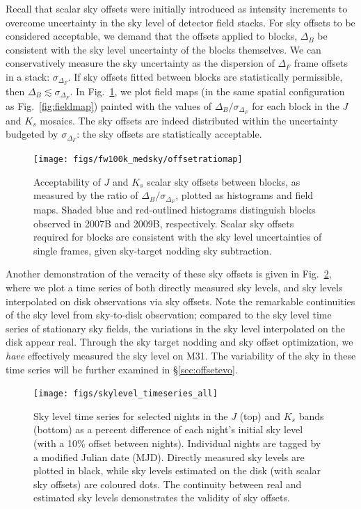 \documentclass[iop]{emulateapj}
\newcommand{\Fig}[1]{Fig.~\ref{fig:#1}}  %
\newcommand{\Sec}[1]{\S\ref{sec:#1}}  %
\begin{document}
Recall that scalar sky offsets were initially introduced as intensity increments to overcome uncertainty in the sky level of detector field stacks.
For sky offsets to be considered acceptable, we demand that the offsets applied to blocks, $\Delta_B$ be consistent with the sky level uncertainty of the blocks themselves.
We can conservatively measure the sky uncertainty as the dispersion of $\Delta_F$ frame offsets in a stack: $\sigma_{\Delta_F}$.
If sky offsets fitted between blocks are statistically permissible, then $\Delta_B \lesssim \sigma_{\Delta_F}$.
In \Fig{offset_ratio_map}, we plot field maps (in the same spatial configuration as \Fig{fieldmap}) painted with the values of $\Delta_B / \sigma_{\Delta_F}$ for each block in the $J$ and $K_s$ mosaics.
The sky offsets are indeed distributed within the uncertainty budgeted by $\sigma_{\Delta_F}$: the sky offsets are statistically acceptable.

\begin{figure}[t]
\centering
\texttt{[image: figs/fw100k\_medsky/offsetratiomap]}
\caption{Acceptability of $J$ and $K_s$ scalar sky offsets between blocks, as measured by the ratio of $\Delta_B/\sigma_{\Delta_F}$, plotted as histograms and field maps. Shaded blue and red-outlined histograms distinguish blocks observed in 2007B and 2009B, respectively. Scalar sky offsets required for blocks are consistent with the sky level uncertainties of single frames, given sky-target nodding sky subtraction.}
\label{fig:offset_ratio_map}
\end{figure}

Another demonstration of the veracity of these sky offsets is given in \Fig{skylevel_timeseries}, where we plot a time series of both directly measured sky levels, and sky levels interpolated on disk observations via sky offsets.
Note the remarkable continuities of the sky level from sky-to-disk observation; compared to the sky level time series of stationary sky fields, the variations in the sky level interpolated on the disk appear real.
Through the sky target nodding and sky offset optimization, we \emph{have} effectively measured the sky level on M31.
The variability of the sky in these time series will be further examined in \Sec{offsetevo}.

\begin{figure}[t]
\centering
\texttt{[image: figs/skylevel\_timeseries\_all]}
\caption{Sky level time series for selected nights in the $J$ (top) and $K_s$ bands (bottom) as a percent difference of each night's initial sky level (with a 10\% offset between nights).
Individual nights are tagged by a modified Julian date (MJD).
Directly measured sky levels are plotted in black, while sky levels estimated on the disk (with scalar sky offsets) are coloured dots. The continuity between real and estimated sky levels demonstrates the validity of sky offsets.}
\label{fig:skylevel_timeseries}
\end{figure}
\end{document}

